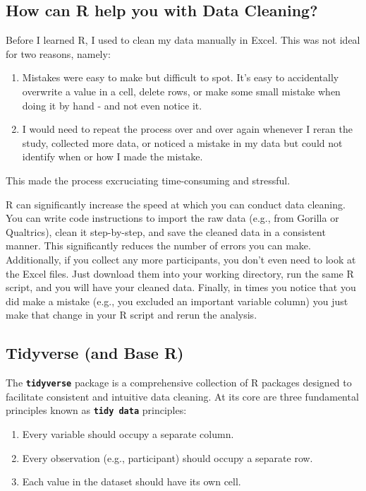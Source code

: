\documentclass[
]{book}
\begin{document}
\subsection{\texorpdfstring{\textbf{How can R help you with Data Cleaning?}}{How can R help you with Data Cleaning?}}\label{how-can-r-help-you-with-data-cleaning}

Before I learned R, I used to clean my data manually in Excel. This was not ideal for two reasons, namely:

\begin{enumerate}
\def\labelenumi{\arabic{enumi}.}
\item
  Mistakes were easy to make but difficult to spot. It's easy to accidentally overwrite a value in a cell, delete rows, or make some small mistake when doing it by hand - and not even notice it.
\item
  I would need to repeat the process over and over again whenever I reran the study, collected more data, or noticed a mistake in my data but could not identify when or how I made the mistake.
\end{enumerate}

This made the process excruciating time-consuming and stressful.

R can significantly increase the speed at which you can conduct data cleaning. You can write code instructions to import the raw data (e.g., from Gorilla or Qualtrics), clean it step-by-step, and save the cleaned data in a consistent manner. This significantly reduces the number of errors you can make. Additionally, if you collect any more participants, you don't even need to look at the Excel files. Just download them into your working directory, run the same R script, and you will have your cleaned data. Finally, in times you notice that you did make a mistake (e.g., you excluded an important variable column) you just make that change in your R script and rerun the analysis.

\subsection{Tidyverse (and Base R)}\label{tidyverse-and-base-r}

The \textbf{\texttt{tidyverse}} package is a comprehensive collection of R packages designed to facilitate consistent and intuitive data cleaning. At its core are three fundamental principles known as \textbf{\texttt{tidy\ data}} principles:

\begin{enumerate}
\def\labelenumi{\arabic{enumi}.}
\item
  Every variable should occupy a separate column.
\item
  Every observation (e.g., participant) should occupy a separate row.
\item
  Each value in the dataset should have its own cell.
\end{enumerate}
\end{document}
